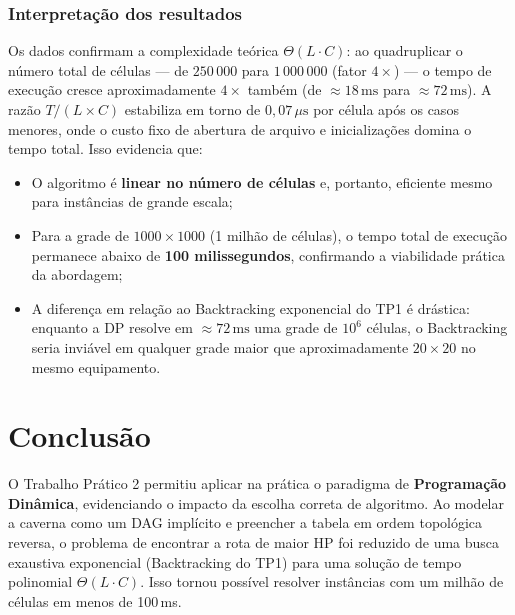 \documentclass[12pt,a4paper]{article}
\makeatletter
\DeclareRobustCommand{\_}{%
  \ifmmode
    \nfss@text{\textunderscore}%
  \else
    \textunderscore\allowbreak
  \fi
}
\makeatother
\begin{document}
\subsubsection*{Interpreta\c{c}\~{a}o dos resultados}

Os dados confirmam a complexidade te\'{o}rica $\Theta(L \cdot C)$: ao quadruplicar o n\'{u}mero total de c\'{e}lulas --- de $250\,000$ para $1\,000\,000$ (fator $4\times$) --- o tempo de execu\c{c}\~{a}o cresce aproximadamente $4\times$ tamb\'{e}m (de $\approx 18\,\text{ms}$ para $\approx 72\,\text{ms}$). A raz\~{a}o $T / (L \times C)$ estabiliza em torno de $0{,}07\,\mu\text{s}$ por c\'{e}lula ap\'{o}s os casos menores, onde o custo fixo de abertura de arquivo e inicializa\c{c}\~{o}es domina o tempo total. Isso evidencia que:

\begin{itemize}
    \item O algoritmo \'{e} \textbf{linear no n\'{u}mero de c\'{e}lulas} e, portanto, eficiente mesmo para inst\^{a}ncias de grande escala;
    \item Para a grade de $1000 \times 1000$ (1 milh\~{a}o de c\'{e}lulas), o tempo total de execu\c{c}\~{a}o permanece abaixo de \textbf{100 milissegundos}, confirmando a viabilidade pr\'{a}tica da abordagem;
    \item A diferen\c{c}a em rela\c{c}\~{a}o ao Backtracking exponencial do TP1 \'{e} dr\'{a}stica: enquanto a DP resolve em $\approx 72\,\text{ms}$ uma grade de $10^6$ c\'{e}lulas, o Backtracking seria invi\'{a}vel em qualquer grade maior que aproximadamente $20 \times 20$ no mesmo equipamento.
\end{itemize}


\section{Conclusão}

O Trabalho Prático 2 permitiu aplicar na prática o paradigma de \textbf{Programação Dinâmica}, evidenciando o impacto da escolha correta de algoritmo. Ao modelar a caverna como um DAG implícito e preencher a tabela em ordem topológica reversa, o problema de encontrar a rota de maior HP foi reduzido de uma busca exaustiva exponencial (Backtracking do TP1) para uma solução de tempo polinomial $\Theta(L \cdot C)$. Isso tornou possível resolver instâncias com um milhão de células em menos de 100\,ms.
\end{document}

